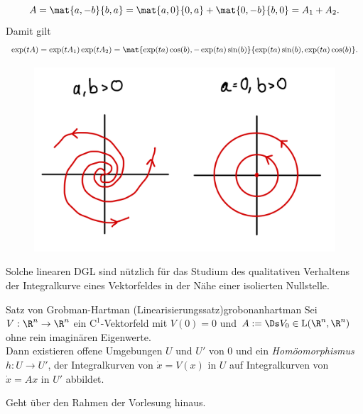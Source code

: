 \begin{bemerkung}
\begin{enumerate}
\begin{equation}
A = \mat{a, -b}{b,a} = \mat{a,0}{0,a}+\mat{0,-b}{b,0} = A_1 + A_2.
\end{equation}
Damit gilt
\begin{equation}
\exp(tA) = \exp(tA_1)\exp(tA_2)=\mat{\exp(ta)\cos(b), - \exp(ta) \sin(b)}{\exp(ta) \sin(b), \exp(ta) \cos(b)}.
\end{equation}
\begin{figure}[H]
\label{fig:fall3}
\centering
\includegraphics[width=0.3\linewidth]{Bilder/fall3.png}
\end{figure}
\end{enumerate}
\end{bemerkung}
\begin{bemerkung}
Solche linearen DGL sind nützlich für das Studium des qualitativen Verhaltens der Integralkurve eines Vektorfeldes in der Nähe einer isolierten Nullstelle.
\end{bemerkung}
\begin{theorem}{Satz von Grobman-Hartman (Linearisierungssatz)}{grobonanhartman}
Sei $V: \R^n \to \R^n$ ein $\text{C}^1$-Vektorfeld mit $V(0)=0$ und $A := \Ds V_0 \in \text{L}(\R^n, \R^n)$ ohne rein imaginären Eigenwerte.\\
Dann existieren offene Umgebungen $U$ und $U'$ von $0$ und ein \textit{Homöomorphismus} $h: U \to U'$, der Integralkurven von $\dot{x} = V(x)$ in $U$ auf Integralkurven von $\dot{x} = Ax$ in $U'$ abbildet.
\end{theorem}
\begin{beweis}
Geht über den Rahmen der Vorlesung hinaus.
\end{beweis}

